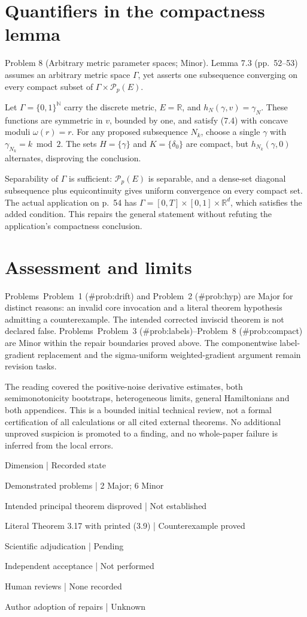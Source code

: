 \documentclass[10pt]{article}
\begin{document}
\section*{Quantifiers in the compactness lemma}
Problem 8 (Arbitrary metric parameter spaces; Minor).  Lemma 7.3 (pp. 52–53) assumes an arbitrary metric space \(\Gamma\), yet asserts one subsequence converging on every compact subset of \(\Gamma\times\mathcal P_p(E)\).\par
Let \(\Gamma=\{0,1\}^{\mathbb N}\) carry the discrete metric, \(E=\mathbb R\), and \(h_N(\gamma,v)=\gamma_N\). These functions are symmetric in \(v\), bounded by one, and satisfy (7.4) with concave moduli \(\omega(r)=r\). For any proposed subsequence \(N_k\), choose a single \(\gamma\) with \(\gamma_{N_k}=k\bmod2\). The sets \(H=\{\gamma\}\) and \(K=\{\delta_0\}\) are compact, but \(h_{N_k}(\gamma,0)\) alternates, disproving the conclusion.\par
Separability of \(\Gamma\) is sufficient: \(\mathcal P_p(E)\) is separable, and a dense-set diagonal subsequence plus equicontinuity gives uniform convergence on every compact set. The actual application on p. 54 has \(\Gamma=[0,T]\times[0,1]\times\mathbb R^d\), which satisfies the added condition. This repairs the general statement without refuting the application’s compactness conclusion.\par
\section*{Assessment and limits}
Problems Problem 1 (\#prob:drift) and Problem 2 (\#prob:hyp) are Major for distinct reasons: an invalid core invocation and a literal theorem hypothesis admitting a counterexample. The intended corrected inviscid theorem is not declared false. Problems Problem 3 (\#prob:labels)–Problem 8 (\#prob:compact) are Minor within the repair boundaries proved above. The componentwise label-gradient replacement and the sigma-uniform weighted-gradient argument remain revision tasks.\par
The reading covered the positive-noise derivative estimates, both semimonotonicity bootstraps, heterogeneous limits, general Hamiltonians and both appendices. This is a bounded initial technical review, not a formal certification of all calculations or all cited external theorems. No additional unproved suspicion is promoted to a finding, and no whole-paper failure is inferred from the local errors.\par
Dimension | Recorded state\par
Demonstrated problems | 2 Major; 6 Minor\par
Intended principal theorem disproved | Not established\par
Literal Theorem 3.17 with printed (3.9) | Counterexample proved\par
Scientific adjudication | Pending\par
Independent acceptance | Not performed\par
Human reviews | None recorded\par
Author adoption of repairs | Unknown\par
\end{document}
